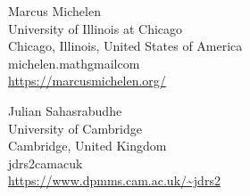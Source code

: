 \documentclass{daj}
\theoremstyle{definition}
\theoremstyle{remark}
\begin{document}
\begin{dajauthors}
\begin{authorinfo}[marcus]
  Marcus Michelen\\
  University of Illinois at Chicago\\
  Chicago, Illinois, United States of America\\
  michelen.math\imageat{}gmail\imagedot{}com \\
  \url{https://marcusmichelen.org/}
\end{authorinfo}
\begin{authorinfo}[julian]
  Julian Sahasrabudhe\\
  University of Cambridge \\
  Cambridge, United Kingdom \\
  jdrs2\imageat{}cam\imagedot{}ac\imagedot{}uk \\
  \url{https://www.dpmms.cam.ac.uk/~jdrs2}
\end{authorinfo}

\end{dajauthors}
\end{document}
